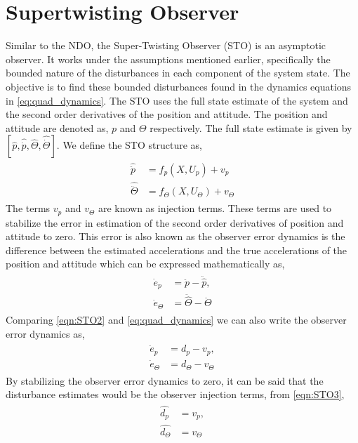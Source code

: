 \documentclass[letterpaper%
, twoside%
, 12pt%
,memoire%
, english%
,creativecommons,hyperref%
]{thETS}
\begin{document}
\section{Supertwisting Observer} \label{Sec:STO}
Similar to the NDO, the Super-Twisting Observer (STO) is an asymptotic observer. It works under the assumptions mentioned earlier, specifically the bounded nature of the disturbances in each component of the system state. The objective is to find these bounded disturbances found in the dynamics equations in \eqref{eq:quad_dynamics}.
The STO uses the full state estimate of the system and the second order derivatives of the position and attitude. The position and attitude are denoted as, $p$ and $\Theta$ respectively. The full state estimate is given by $[\hat{p}, \hat{\dot{p}}, \hat{\Theta}, \hat{\dot{\Theta}}]$. We define the STO structure as, 
\begin{align} \label{eqn:STO1}
\begin{aligned}
\hat{\ddot{p}}&=f_p(X,U_p)+v_p \\
\hat{\ddot{\Theta}}&=f_\Theta(X,U_\Theta)+v_\Theta 
\end{aligned}
\end{align}
The terms $v_p$ and $v_\Theta$ are known as injection terms. These terms are used to stabilize the error in estimation of the second order derivatives of position and attitude to zero. This error is also known as the observer error dynamics is the difference between the estimated accelerations and the true accelerations of the position and attitude which can be expressed mathematically as, 
\begin{align}\label{eqn:STO2}
\begin{aligned}
\dot{e}_p&=\ddot{p}-\ddot{\hat{p}}, \\
\dot{e}_\Theta&=\ddot{\hat{\Theta}}-\ddot{\Theta}
\end{aligned}
\end{align}
Comparing \eqref{eqn:STO2} and \eqref{eq:quad_dynamics} we can also write the observer error dynamics as, 
\begin{align}\label{eqn:STO3} 
\begin{aligned}
\dot{e}_p&=d_p-v_p, \\
\dot{e}_\Theta&=d_\Theta-v_\Theta
\end{aligned}
\end{align}
By stabilizing the observer error dynamics to zero, it can be said that the disturbance estimates would be the observer injection terms, from \eqref{eqn:STO3}, 
\begin{align}\label{eqn:STO4} 
\begin{aligned}
\hat{d_p}&=v_p, \\
\hat{d_\Theta}&=v_\Theta
\end{aligned}
\end{align}
\end{document}
